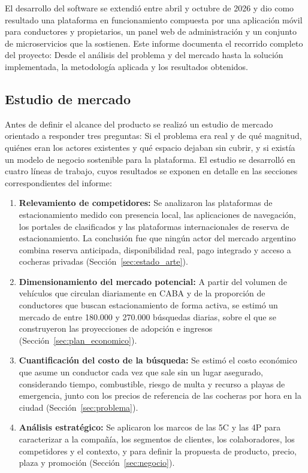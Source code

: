 El desarrollo del software se extendió entre abril y octubre de 2026 y dio como resultado una plataforma en funcionamiento compuesta por una aplicación móvil para conductores y propietarios, un panel web de administración y un conjunto de microservicios que la sostienen. Este informe documenta el recorrido completo del proyecto: Desde el análisis del problema y del mercado hasta la solución implementada, la metodología aplicada y los resultados obtenidos.

\subsection{Estudio de mercado}

Antes de definir el alcance del producto se realizó un estudio de mercado orientado a responder tres preguntas: Si el problema era real y de qué magnitud, quiénes eran los actores existentes y qué espacio dejaban sin cubrir, y si existía un modelo de negocio sostenible para la plataforma. El estudio se desarrolló en cuatro líneas de trabajo, cuyos resultados se exponen en detalle en las secciones correspondientes del informe:

\begin{enumerate}
    \item \textbf{Relevamiento de competidores:} Se analizaron las plataformas de estacionamiento medido con presencia local, las aplicaciones de navegación, los portales de clasificados y las plataformas internacionales de reserva de estacionamiento. La conclusión fue que ningún actor del mercado argentino combina reserva anticipada, disponibilidad real, pago integrado y acceso a cocheras privadas (Sección~\ref{sec:estado_arte}).
    \item \textbf{Dimensionamiento del mercado potencial:} A partir del volumen de vehículos que circulan diariamente en CABA y de la proporción de conductores que buscan estacionamiento de forma activa, se estimó un mercado de entre 180.000 y 270.000 búsquedas diarias, sobre el que se construyeron las proyecciones de adopción e ingresos (Sección~\ref{sec:plan_economico}).
    \item \textbf{Cuantificación del costo de la búsqueda:} Se estimó el costo económico que asume un conductor cada vez que sale sin un lugar asegurado, considerando tiempo, combustible, riesgo de multa y recurso a playas de emergencia, junto con los precios de referencia de las cocheras por hora en la ciudad (Sección~\ref{sec:problema}).
    \item \textbf{Análisis estratégico:} Se aplicaron los marcos de las 5C y las 4P para caracterizar a la compañía, los segmentos de clientes, los colaboradores, los competidores y el contexto, y para definir la propuesta de producto, precio, plaza y promoción (Sección~\ref{sec:negocio}).
\end{enumerate}


